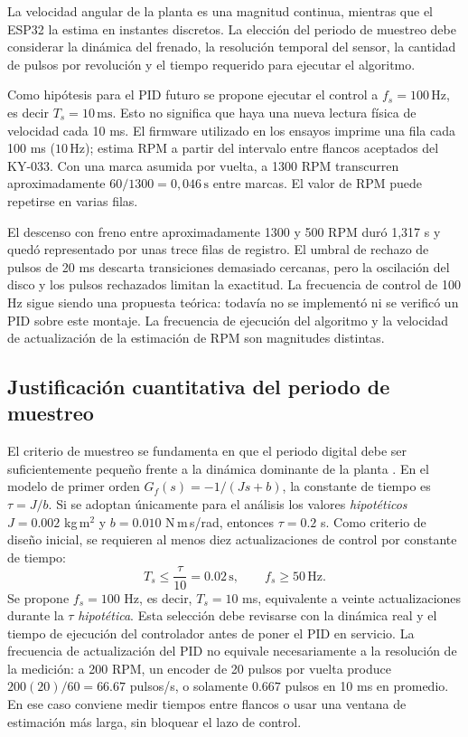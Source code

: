 \documentclass[9pt,a4paper,twocolumn]{extarticle}
\begin{document}
La velocidad angular de la planta es una magnitud continua, mientras que
el ESP32 la estima en instantes discretos. La elección del periodo de
muestreo debe considerar la dinámica del frenado, la resolución temporal
del sensor, la cantidad de pulsos por revolución y el tiempo requerido
para ejecutar el algoritmo.

Como hipótesis para el PID futuro se propone ejecutar el control a
\(f_s=100\,\mathrm{Hz}\), es decir \(T_s=10\,\mathrm{ms}\).
Esto no significa que haya una nueva lectura física de velocidad cada
10 ms. El firmware utilizado en los ensayos imprime una fila cada
100 ms (\(10\,\mathrm{Hz}\)); estima RPM a partir del intervalo entre
flancos aceptados del KY-033. Con una marca asumida por vuelta, a
1300 RPM transcurren aproximadamente \(60/1300=0,046\,\mathrm{s}\)
entre marcas. El valor de RPM puede repetirse en varias filas.

El descenso con freno entre aproximadamente 1300 y 500 RPM duró
1,317 s y quedó representado por unas trece filas de registro.
El umbral de rechazo de pulsos de 20 ms descarta transiciones
demasiado cercanas, pero la oscilación del disco y los pulsos
rechazados limitan la exactitud. La frecuencia de control de
100 Hz sigue siendo una propuesta teórica: todavía no se implementó
ni se verificó un PID sobre este montaje. La frecuencia de ejecución
del algoritmo y la velocidad de actualización de la estimación de RPM
son magnitudes distintas.
\subsection{Justificación cuantitativa del periodo de muestreo}
El criterio de muestreo se fundamenta en que el periodo digital debe ser suficientemente pequeño frente a la dinámica dominante de la planta \cite{franklin2015}.
En el modelo de primer orden $G_f(s)=-1/(Js+b)$, la constante de tiempo
es $\tau=J/b$. Si se adoptan únicamente para el análisis los valores
\emph{hipotéticos} $J=0.002$ kg\,m$^2$ y
$b=0.010$ N\,m\,s/rad, entonces $\tau=0.2$ s. Como criterio de diseño
inicial, se requieren al menos diez actualizaciones de control por
constante de tiempo:
\begin{equation}
T_s\leq\frac{\tau}{10}=0.02\,\mathrm{s},\qquad f_s\geq50\,\mathrm{Hz}.
\end{equation}
Se propone $f_s=100$ Hz, es decir, $T_s=10$ ms, equivalente a veinte
actualizaciones durante la $\tau$ \emph{hipotética}. Esta selección
debe revisarse con la dinámica real y el tiempo de ejecución del
controlador antes de poner el PID en servicio.
La frecuencia de actualización del PID no equivale necesariamente a la
resolución de la medición: a 200 RPM, un encoder de 20 pulsos por vuelta
produce $200(20)/60=66.67$ pulsos/s, o solamente $0.667$ pulsos en
10 ms en promedio. En ese caso conviene medir tiempos entre flancos o
usar una ventana de estimación más larga, sin bloquear el lazo de control.
\end{document}

